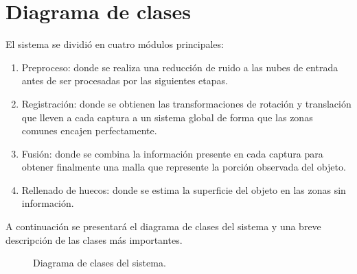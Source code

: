 \section{Diagrama de clases}
El sistema se dividió en cuatro módulos principales:
\begin{enumerate}
	\item Preproceso:
		donde se realiza una reducción de ruido a las nubes de entrada
		antes de ser procesadas por las siguientes etapas.
	\item Registración:
		donde se obtienen las transformaciones de rotación y translación
		que lleven a cada captura a un sistema global
		de forma que las zonas comunes encajen perfectamente.
	\item Fusión:
		donde se combina la información presente en cada captura
		para obtener finalmente una malla que represente la porción observada del objeto.
	\item Rellenado de huecos:
		donde se estima la superficie del objeto en las zonas sin información.
\end{enumerate}

A continuación se presentará el diagrama de clases del sistema y una breve descripción de las clases más importantes.

\begin{figure}[h]
	\caption{\label{fig:diagrama_de_clases}Diagrama de clases del sistema.}
\end{figure}

